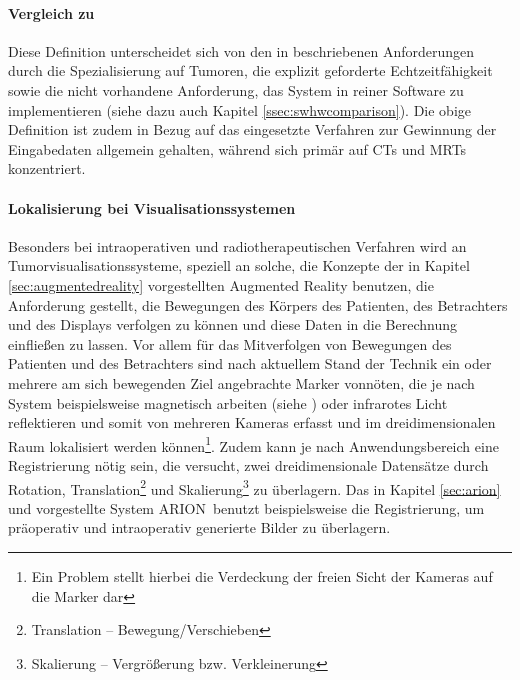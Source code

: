 \documentclass[ngerman,pdftex,paper=A4,DIV=calc,titlepage,12pt]{scrartcl}
\newtheorem[L]{boxedDefinition}{Definition}
\begin{document}
\paragraph{Vergleich zu \cite[Kapitel 3.1.1, Seite 17f.]{Bruckner2004}}\label{p:bru04comparison}
Diese Definition unterscheidet sich von den in \cite[Kapitel 3.1.1, Seite 17]{Bruckner2004} beschriebenen Anforderungen durch die Spezialisierung auf Tumoren, die explizit geforderte Echtzeitfähigkeit sowie die nicht vorhandene Anforderung, das System in reiner Software zu implementieren (siehe dazu auch Kapitel \vref{ssec:swhwcomparison}). Die obige Definition ist zudem in Bezug auf das eingesetzte Verfahren zur Gewinnung der Eingabedaten allgemein gehalten, während \cite{Bruckner2004} sich primär auf CTs und MRTs konzentriert.

\paragraph{Lokalisierung bei Visualisationssystemen}
Besonders bei intraoperativen und radiotherapeutischen Verfahren wird an Tumorvisualisationssysteme, speziell an solche, die Konzepte der in Kapitel \ref{sec:augmentedreality} vorgestellten Augmented Reality benutzen, die Anforderung gestellt, die Bewegungen des Körpers des Patienten, des Betrachters und des Displays verfolgen zu können und diese Daten in die Berechnung einfließen zu lassen. Vor allem für das Mitverfolgen von Bewegungen des Patienten und des Betrachters sind nach aktuellem Stand der Technik ein oder mehrere am sich bewegenden Ziel angebrachte Marker vonnöten, die je nach System beispielsweise magnetisch arbeiten (siehe \cite{Suthau2002DE}) oder infrarotes Licht reflektieren und somit von mehreren Kameras erfasst und im dreidimensionalen Raum lokalisiert werden können\footnote{Ein Problem stellt hierbei die Verdeckung der freien Sicht der Kameras auf die Marker dar}. Zudem kann je nach Anwendungsbereich eine Registrierung nötig sein, die versucht, zwei dreidimensionale Datensätze durch Rotation, Translation\footnote{Translation -- Bewegung/Verschieben} und Skalierung\footnote{Skalierung -- Vergrößerung bzw. Verkleinerung} zu überlagern. Das in Kapitel \vref{sec:arion} und \cite{Suthau2002DE} vorgestellte System ARION\texttrademark\ benutzt beispielsweise die Registrierung, um präoperativ und intraoperativ generierte Bilder zu überlagern. 
 
\end{document}

